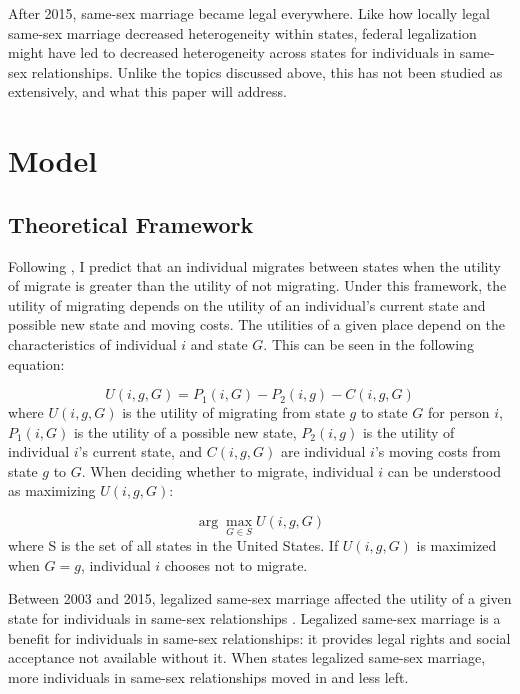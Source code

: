\documentclass[12pt,letterpaper]{article}
\begin{document}
After 2015, same-sex marriage became legal everywhere. Like how locally legal same-sex marriage decreased heterogeneity within states, federal legalization might have led to decreased heterogeneity across states for individuals in same-sex relationships. Unlike the topics discussed above, this has not been studied as extensively, and what this paper will address.




\section{Model}
\subsection{Theoretical Framework}
Following \citet{1, 12, 18}, I predict that an individual migrates between states when the utility of migrate is greater than the utility of not migrating. Under this framework, the utility of migrating depends on the utility of an individual's current state and possible new state and moving costs. The utilities of a given place depend on the characteristics of individual $i$ and state $G$. This can be seen in the following equation: 

\begin{equation}
U(i, g, G) = P_1(i, G) - P_2(i, g) - C(i, g, G)
\end{equation}
where $U(i, g, G)$ is the utility of migrating from state $g$ to state $G$ for person $i$, $P_1(i, G)$ is the utility of a possible new state, $P_2(i, g)$ is the utility of individual $i$'s current state, and $C(i, g, G)$ are individual $i$'s moving costs from state $g$ to $G$. When deciding whether to migrate, individual $i$ can be understood as maximizing $U(i, g, G)$:

\begin{equation}
\arg\max_{G \in S} U(i, g, G)
\end{equation}
where S is the set of all states in the United States. If $U(i, g, G)$ is maximized when $G = g$, individual $i$ chooses not to migrate.

\hfill
\break
Between 2003 and 2015, legalized same-sex marriage affected the utility of a given state for individuals in same-sex relationships \citep{1, 12}. Legalized same-sex marriage is a benefit for individuals in same-sex relationships: it provides legal rights and social acceptance not available without it. When states legalized same-sex marriage, more individuals in same-sex relationships moved in and less left. 
\end{document}
